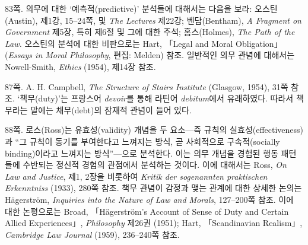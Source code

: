{\footnotesize
\noteentry 83쪽.  의무에 대한
‘예측적(predictive)’ 분석들에 대해서는 다음을 보라: 오스틴(Austin),
 제1강, 15--24쪽,
및 \emph{The Lectures} 제22강; 벤담(Bentham), \emph{A Fragment on
Government} 제5장, 특히 제6절 및 그에 대한 주석; 홈스(Holmes), \emph{The
Path of the Law.} 오스틴의 분석에 대한 비판으로는 Hart, 「Legal and
Moral Obligation」 (\emph{Essays in Moral Philosophy}, 편집: Melden)
참조. 일반적인 의무 관념에 대해서는 Nowell-Smith, \emph{Ethics} (1954),
제14장 참조.

\noteentry 87쪽.  A. H. Campbell,
\emph{The Structure of Stairs Institute} (Glasgow, 1954), 31쪽 참조.
‘책무(duty)’는 프랑스어 \emph{devoir}를 통해 라틴어 \emph{debitum}에서
유래하였다. 따라서 책무라는 말에는 채무(debt)의 잠재적 관념이 들어 있다.

\noteentry 88쪽.  로스(Ross)는
유효성(validity) 개념을 두 요소---즉 규칙의 실효성(effectiveness)과 “그
규칙이 동기를 부여한다고 느껴지는 방식, 곧 사회적으로 구속적(socially
binding)이라고 느껴지는 방식”---으로 분석한다. 이는 의무 개념을 경험된
행동 패턴들에 수반되는 정신적 경험의 관점에서 분석하는 것이다. 이에
대해서는 Ross, \emph{On Law and Justice}, 제1, 2장을 비롯하여
\emph{Kritik der sogenannten praktischen Erkenntniss} (1933), 280쪽
참조. 책무 관념이 감정과 맺는 관계에 대한 상세한 논의는 Hägerström,
\emph{Inquiries into the Nature of Law and Morals}, 127--200쪽 참조.
이에 대한 논평으로는 Broad, 「Hägerström's Account of Sense of Duty and
Certain Allied Experiences」, \emph{Philosophy} 제26권 (1951); Hart,
「Scandinavian Realism」, \emph{Cambridge Law Journal} (1959),
236--240쪽 참조.

}
